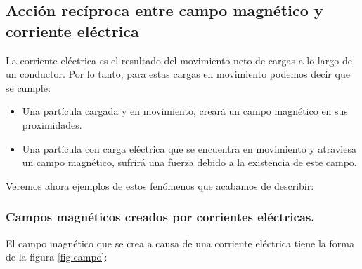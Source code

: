 \documentclass{article}
\begin{document}
\subsection{Acción recíproca entre campo magnético y corriente eléctrica}
La corriente eléctrica es el resultado del movimiento neto de cargas a lo largo de un conductor. Por lo tanto, para estas cargas en movimiento podemos decir que se cumple: 
\begin{itemize}

\item Una partícula cargada y en movimiento, creará un campo magnético en sus proximidades.
\item Una partícula con carga eléctrica que se encuentra en movimiento y atraviesa un campo magnético, sufrirá una fuerza debido a la existencia de este campo.

\end{itemize}

Veremos ahora ejemplos de estos fenómenos que acabamos de describir:

\subsubsection{Campos magnéticos creados por corrientes eléctricas.}
El campo magnético que se crea a causa de una corriente eléctrica tiene la forma de la figura \ref{fig:campo}:
\end{document}
